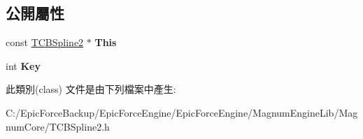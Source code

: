 \subsection*{公開屬性}
\begin{DoxyCompactItemize}
\item 
const \hyperlink{class_magnum_1_1_t_c_b_spline2}{T\+C\+B\+Spline2} $\ast$ {\bfseries This}\hypertarget{class_magnum_1_1_t_c_b_spline2_1_1_this_plus_key_a819c9e212c675b8840d36dae9f2b9772}{}\label{class_magnum_1_1_t_c_b_spline2_1_1_this_plus_key_a819c9e212c675b8840d36dae9f2b9772}

\item 
int {\bfseries Key}\hypertarget{class_magnum_1_1_t_c_b_spline2_1_1_this_plus_key_ac718d8dfbbe39f9486c41959f1957d5f}{}\label{class_magnum_1_1_t_c_b_spline2_1_1_this_plus_key_ac718d8dfbbe39f9486c41959f1957d5f}

\end{DoxyCompactItemize}


此類別(class) 文件是由下列檔案中產生\+:\begin{DoxyCompactItemize}
\item 
C\+:/\+Epic\+Force\+Backup/\+Epic\+Force\+Engine/\+Epic\+Force\+Engine/\+Magnum\+Engine\+Lib/\+Magnum\+Core/T\+C\+B\+Spline2.\+h\end{DoxyCompactItemize}
